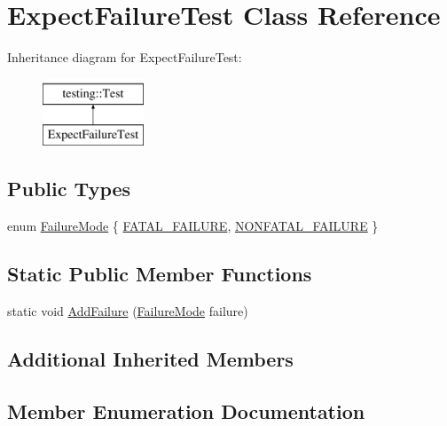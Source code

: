 \hypertarget{classExpectFailureTest}{}\section{Expect\+Failure\+Test Class Reference}
\label{classExpectFailureTest}
Inheritance diagram for Expect\+Failure\+Test\+:\begin{figure}[H]
\begin{center}
\leavevmode
\includegraphics[height=2.000000cm]{classExpectFailureTest}
\end{center}
\end{figure}
\subsection*{Public Types}
\begin{DoxyCompactItemize}
\item 
enum \mbox{\hyperlink{classExpectFailureTest_aad05da10bb15d21a434eba3b37011406}{Failure\+Mode}} \{ \mbox{\hyperlink{classExpectFailureTest_aad05da10bb15d21a434eba3b37011406a3d618496b7e2a2c256e02186bddee4ec}{F\+A\+T\+A\+L\+\_\+\+F\+A\+I\+L\+U\+RE}}, 
\mbox{\hyperlink{classExpectFailureTest_aad05da10bb15d21a434eba3b37011406aeabdbecc0c4550d4f46cd44ac62fb92b}{N\+O\+N\+F\+A\+T\+A\+L\+\_\+\+F\+A\+I\+L\+U\+RE}}
 \}
\end{DoxyCompactItemize}
\subsection*{Static Public Member Functions}
\begin{DoxyCompactItemize}
\item 
static void \mbox{\hyperlink{classExpectFailureTest_ab9aeb7820ff7953fc2975ecc5abd046b}{Add\+Failure}} (\mbox{\hyperlink{classExpectFailureTest_aad05da10bb15d21a434eba3b37011406}{Failure\+Mode}} failure)
\end{DoxyCompactItemize}
\subsection*{Additional Inherited Members}


\subsection{Member Enumeration Documentation}
\mbox{\label{classExpectFailureTest_aad05da10bb15d21a434eba3b37011406}} 
